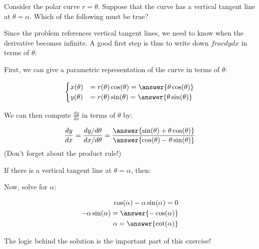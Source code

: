 \documentclass{ximera}
\author{Jim Talamo}
\begin{document}
\begin{exercise}
Consider the polar curve $r = \theta$.  Suppose that the curve has a vertical tangent line at $\theta = \alpha$.  Which of the following must be true?

\begin{multipleChoice}
\choice{$\alpha = \cos{\alpha}$}
\choice{$\alpha = -\cos{\alpha}$}
\choice{$\alpha = \sin{\alpha}$}
\choice{$\alpha = -\sin{\alpha}$}
\choice{$\alpha = \tan{\alpha}$}
\choice{$\alpha = -\tan{\alpha}$}
\end{multipleChoice}

\begin{hint}
Since the problem references vertical tangent lines, we need to know when the derivative becomes infinite.  A good first step is thus to write down $frac{dy}{dx}$ in terms of $\theta$:

First, we can give a parametric representation of the curve in terms of $\theta$:

\[
\begin{cases}
x(\theta) &= r(\theta) \cos(\theta) = \answer{\theta \cos(\theta)}\\
y(\theta) &= r(\theta) \sin(\theta) = \answer{\theta \sin(\theta)}
\end{cases}
\]

We can then compute $\frac{dy}{dx}$ in terms of $\theta$ by:

\[
\frac{dy}{dx} = \frac{dy / d\theta}{dx / d\theta} = \frac{ \answer{\sin(\theta) + \theta \cos(\theta)} }{ \answer{\cos(\theta) - \theta \sin(\theta)} }
\]
(Don't forget about the product rule!)

\begin{question}
If there is a vertical tangent line at $\theta = \alpha$, then:

\begin{multipleChoice}
\end{multipleChoice}
\end{question}

Now, solve for $\alpha$:

\begin{align*}
\cos(\alpha) - \alpha \sin(\alpha)=0 \\
 - \alpha \sin(\alpha)=\answer{-\cos(\alpha)}\\
\alpha = \answer{\cot(\alpha)}
\end{align*}
\end{hint}

The logic behind the solution is the important part of this exercise!

\end{exercise}
\end{document}
